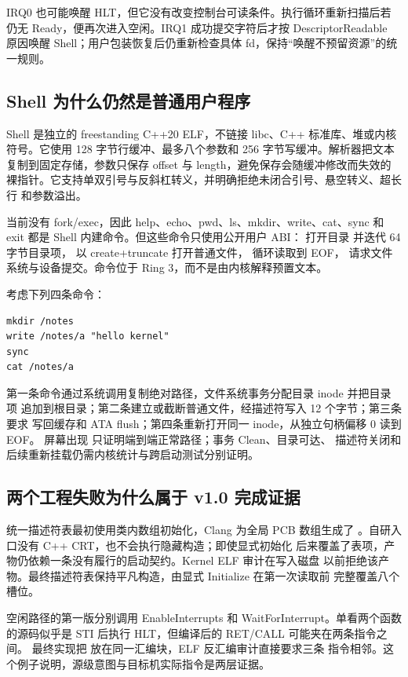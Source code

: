 IRQ0 也可能唤醒 HLT，但它没有改变控制台可读条件。执行循环重新扫描后若仍无
Ready，便再次进入空闲。IRQ1 成功提交字符后才按 DescriptorReadable 原因唤醒
Shell；用户包装恢复后仍重新检查具体 fd，保持“唤醒不预留资源”的统一规则。

\subsection{Shell 为什么仍然是普通用户程序}

Shell 是独立的 freestanding C++20 ELF，不链接 libc、C++ 标准库、堆或内核
符号。它使用 128 字节行缓冲、最多八个参数和 256 字节写缓冲。解析器把文本
复制到固定存储，参数只保存 offset 与 length，避免保存会随缓冲修改而失效的
裸指针。它支持单双引号与反斜杠转义，并明确拒绝未闭合引号、悬空转义、超长行
和参数溢出。

当前没有 fork/exec，因此 help、echo、pwd、ls、mkdir、write、cat、sync 和
exit 都是 Shell 内建命令。但这些命令只使用公开用户 ABI： 打开目录
并迭代 64 字节目录项， 以 create+truncate 打开普通文件，
 循环读取到 EOF， 请求文件系统与设备提交。命令位于
Ring 3，而不是由内核解释预置文本。

考虑下列四条命令：

\begin{lstlisting}
mkdir /notes
write /notes/a "hello kernel"
sync
cat /notes/a
\end{lstlisting}

第一条命令通过系统调用复制绝对路径，文件系统事务分配目录 inode 并把目录项
追加到根目录；第二条建立或截断普通文件，经描述符写入 12 个字节；第三条要求
写回缓存和 ATA flush；第四条重新打开同一 inode，从独立句柄偏移 0 读到 EOF。
屏幕出现  只证明端到端正常路径；事务 Clean、目录可达、
描述符关闭和后续重新挂载仍需内核统计与跨启动测试分别证明。

\subsection{两个工程失败为什么属于 v1.0 完成证据}

统一描述符表最初使用类内数组初始化，Clang 为全局 PCB 数组生成了
。自研入口没有 C++ CRT，也不会执行隐藏构造；即使显式初始化
后来覆盖了表项，产物仍依赖一条没有履行的启动契约。Kernel ELF 审计在写入磁盘
以前拒绝该产物。最终描述符表保持平凡构造，由显式 Initialize 在第一次读取前
完整覆盖八个槽位。

空闲路径的第一版分别调用 EnableInterrupts 和 WaitForInterrupt。单看两个函数
的源码似乎是 STI 后执行 HLT，但编译后的 RET/CALL 可能夹在两条指令之间。
最终实现把  放在同一汇编块，ELF 反汇编审计直接要求三条
指令相邻。这个例子说明，源级意图与目标机实际指令是两层证据。

